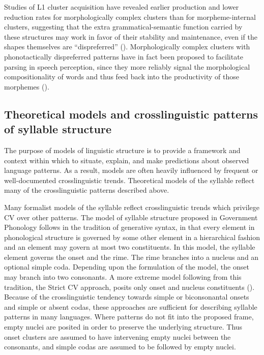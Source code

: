   Studies of L1 cluster acquisition have revealed earlier production and lower reduction rates for morphologically complex clusters than for morpheme-internal clusters, suggesting that the extra grammatical-semantic function carried by these structures may work in favor of their stability and maintenance, even if the shapes themselves are ``dispreferred'' (\citealt{Kamandulyte2006,Zydorowicz2010}). Morphologically complex clusters with phonotactically dispreferred patterns have in fact been proposed to facilitate parsing in speech perception, since they more reliably signal the morphological compositionality of words and thus feed back into the productivity of those morphemes (\citealt{HayBaayen2003,DresslerEtAl2010}). 

\subsection{Theoretical models and crosslinguistic patterns of syllable structure}\label{sec:1.1.3}

  The purpose of models of linguistic structure is to provide a framework and context within which to situate, explain, and make predictions about observed language patterns. As a result, models are often heavily influenced by frequent or well-documented crosslinguistic trends. Theoretical models of the syllable reflect many of the crosslinguistic patterns described above. 

  Many formalist models of the syllable reflect crosslinguistic trends which privilege CV over other patterns. The model of syllable structure proposed in Government Phonology \citep{KayeEtAl1990} follows in the tradition of generative syntax, in that every element in phonological structure is governed by some other element in a hierarchical fashion and an element may govern at most two constituents. In this model, the syllable element governs the onset and the rime. The rime branches into a nucleus and an optional simple coda. Depending upon the formulation of the model, the onset may branch into two consonants. A more extreme model following from this tradition, the Strict CV approach, posits only onset and nucleus constituents (\citealt{Lowenstamm1996,Scheer2004}). Because of the crosslinguistic tendency towards simple or biconsonantal onsets and simple or absent codas, these approaches are sufficient for describing syllable patterns in many languages. Where patterns do not fit into the proposed frame, empty nuclei are posited in order to preserve the underlying structure. Thus onset clusters are assumed to have intervening empty nuclei between the consonants, and simple codas are assumed to be followed by empty nuclei.

